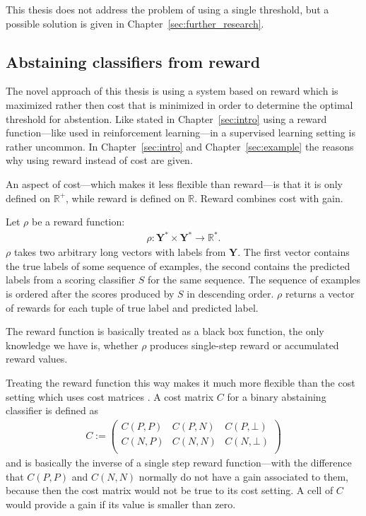 \documentclass[twoside,11pt]{article}
\def\Y{\textbf{Y}}
\begin{document}
This thesis does not address the problem of using a single
threshold, but a possible solution is given in
Chapter~\ref{sec:further_research}.

\subsection{Abstaining classifiers from reward}

The novel approach of this thesis is using a system based
on reward which is maximized rather then cost that is
minimized in order to determine the optimal threshold for
abstention.
Like stated in Chapter~\ref{sec:intro} using a reward
function---like used in reinforcement learning---in a
supervised learning setting is rather uncommon.
In Chapter~\ref{sec:intro} and Chapter~\ref{sec:example}
the reasons why using reward instead of cost are given.

An aspect of cost---which makes it less flexible than
reward---is that it is only defined on $\mathbb{R}^+$,
while reward is defined on $\mathbb{R}$.
Reward combines cost with gain.

Let $\rho$ be a reward function:
\begin{align*}
  \rho: \Y^* \times \Y^* \rightarrow \mathbb{R}^*.
\end{align*}
$\rho$ takes two arbitrary long vectors with labels from
$\Y$.
The first vector contains the true labels of some sequence
of examples, the second contains the predicted labels from
a scoring classifier $S$ for the same sequence.
The sequence of examples is ordered after the scores
produced by $S$ in descending order.
$\rho$ returns a vector of rewards for each tuple of true
label and predicted label.

The reward function is basically treated as a black box
function, the only knowledge we have is, whether $\rho$
produces single-step reward or accumulated reward values.

Treating the reward function this way makes it much more
flexible than the cost setting which uses cost matrices
\citep[see][]{fisher_et_al_2016}. A cost matrix $C$ for a
binary abstaining classifier is defined as
\begin{align*}
  C :=
    \begin{pmatrix}
      C(P, P) &C(P, N) &C(P, \bot) \\
      C(N, P) &C(N, N) &C(N, \bot) \\
    \end{pmatrix}
\end{align*}
and is basically the inverse of a single step reward
function---with the difference that $C(P, P)$ and $C(N, N)$
normally do not have a gain associated to them, because
then the cost matrix would not be true to its cost
setting. A cell of $C$ would provide a gain if its value
is smaller than zero.
\end{document}

